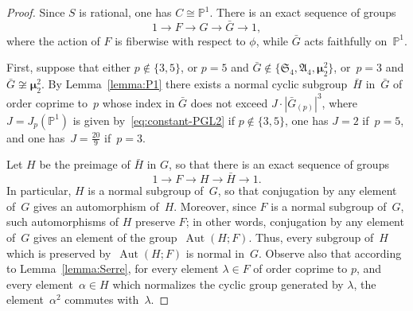 \documentclass[12pt]{amsart}
\numberwithin{equation}{section}
\theoremstyle{definition}
\newcommand{\mumu}{\boldsymbol{\mu}}
\newcommand{\PP}{\mathbb P}
\DeclareMathOperator{\Aut}{Aut}
\begin{document}
\begin{proof}
Since $S$ is rational, one has $C\cong\PP^1$.
There is an exact sequence of groups
$$
1\to F\to G\to \bar{G}\to 1,
$$
where the action of $F$ is fiberwise
with respect to $\phi$, while $\bar{G}$ acts faithfully on~$\PP^1$.

First, suppose that either $p\not\in \{3,5\}$, or $p=5$ and
$\bar{G}\not\in\{\mathfrak{S}_4,\mathfrak{A}_4, \mumu_2^2\}$, or~\mbox{$p=3$} and $\bar{G}\not\cong\mumu_2^2$.
By Lemma~\ref{lemma:P1} there exists a normal
cyclic subgroup~$\bar{H}$ in~$\bar{G}$
of order coprime to~$p$ whose index in $\bar{G}$ does not exceed
$J\cdot |\bar{G}_{(p)}|^3$, where~\mbox{$J=J_p(\PP^1)$}
is given by~\eqref{eq:constant-PGL2} if $p\not\in\{3, 5\}$,
one has $J=2$ if~\mbox{$p=5$}, and one has~\mbox{$J=\frac{20}{9}$} if~\mbox{$p=3$}.

Let $H$ be the preimage of $\bar{H}$ in $G$, so that there
is an exact sequence of groups
$$
1\to F\to H\to \bar{H}\to 1.
$$
In particular, $H$ is a normal subgroup of~$G$,
so that conjugation by any element of~$G$ gives an automorphism of~$H$.
Moreover, since $F$ is a normal subgroup of~$G$, such automorphisms of $H$ preserve $F$;
in other words, conjugation by any element of~$G$ gives an element of the group~\mbox{$\Aut(H;F)$}.
Thus, every subgroup of~$H$ which is preserved by~\mbox{$\Aut(H;F)$} is normal in~$G$.
Observe also that according to Lemma~\ref{lemma:Serre}, for every element
$\lambda\in F$ of order coprime to $p$, and every element~\mbox{$\alpha\in H$}
which normalizes the cyclic group generated by $\lambda$, the element~$\alpha^2$
commutes with~$\lambda$.


\end{proof}
\end{document}
